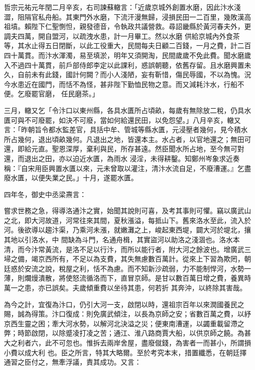 \begin{pinyinscope}
 哲宗元祐元年閏二月辛亥，右司諫蘇轍言：「近歲京城外創置水磨，因此汴水淺澀，阻隔官私舟船。其東門外水磨，下流汗漫無歸，浸損民田一二百里，幾敗漢高祖墳。賴陛下仁聖惻怛，親發德音，令執政共議營救。尋詔畿縣於黃河春夫外，更調夫四萬，開自盟河，以疏洩水患，計一月畢工。然以水磨
 供給京城內外食茶等，其水止得五日閉斷，以此工役重大，民間每夫日顧二百錢，一月之費，計二百四十萬貫。而汴水渾濁，易至填淤，明年又須開淘，民間歲歲不免此費。聞水磨歲入不過四十萬貫，前戶部侍郎李定以此課利，惑誤朝聽，依舊存留。且水磨興置未久，自前未有此錢，國計何闕？而小人淺陋，妄有靳惜，傷民辱國，不以為愧。況今水患近在國門，而恬不為怪，甚非陛下勤恤民物之意。而又減耗汴水，行船不便。乞廢罷官磨，
 任民磨茶。」



 三月，轍又乞「令汴口以東州縣，各具水匱所占頃畝，每歲有無除放二稅，仍具水匱可與不可廢罷，如決不可廢，當如何給還民田，以免怨望。」八月辛亥，轍又言：「昨朝旨令都水監差官，具括中牟、管城等縣水匱，元浸壓者幾何，見今積水所占幾何，退出頃畝幾何。凡退出之地，皆還本主。水占者，以官地還之；無田可還，即給元直。聖恩深厚，棄利與民，所存甚遠。然臣聞水所占地，至今無可對還，而退出之田，亦以迫近水匱，為雨水
 浸淫，未得耕鑿。知鄭州岑象求近奏稱：『自宋用臣興置水匱以來，元未曾取以灌注，清汴水流自足，不廢漕運。』乞盡廢水匱，以便失業之民。」十月，遂罷水匱。



 四年冬，御史中丞梁燾言：



 嘗求世務之急，得導洛通汴之實，始聞其說則可喜，及考其事則可懼。竊以廣武山之北，即大河故道，河常往來其間，夏秋漲溢，每抵山下。舊來洛水至此，流入於河。後欲導以趨汴渠，乃乘河未漲，就嫩灘之上，峻起東西堤，闢大河於堤北，攘其地以引洛水，中
 間缺為斗門，名通舟楫，其實盜河以助洛之淺涸也。洛水本清，而今汴常黃流，是洛不足以行汴，而所以能行者，附大河之餘波也。增廣武三埽之備，竭京西所有，不足以為支費，其失無慮數百萬計。從來上下習為欺罔，朝廷惑於安流之說，稅屋之利，恬不為慮。而不知新沙疏弱，力不能制悍河，水勢一薄，則爛熳潰散，將使怒流循洛而下，直冒京師。是甘以數百萬日增之費，養異時萬一之患，亦已誤矣。夫歲傾重費以坐待其患，何若折
 其奔沖，以終除其害哉。



 為今之計，宜復為汴口，仍引大河一支，啟閉以時，還祖宗百年以來潤國養民之賜，誠為得策。汴口復成：則免廣武傾注，以長為京師之安；省數百萬之費，以紓京西生靈之困；牽大河水勢，以解河北決溢之災；便東南漕運，以蠲重載留滯之弊；時節啟閉，以除蹙凌打凌之苦；通江、淮八路商賈大船，以供京師之饒。為甚大之利者六，此不可忽也。惟拆去兩岸舍屋，盡廢僦錢，為害者一而甚小，所謂損小費以成大利
 也。臣之所言，特其大略爾。至於考究本末，措置纖悉，在朝廷擇通習之臣付之，無牽浮議，責其成功。又言：




\end{pinyinscope}
